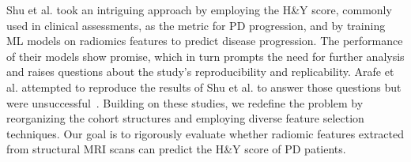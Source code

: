 Shu et al. took an intriguing approach by employing the H\&Y score, commonly used in clinical assessments, as the metric for PD progression, and by training ML models on radiomics features to 
predict disease progression. The performance of their models show promise, which in turn prompts the need for further analysis and raises questions about the study's reproducibility and replicability. 
Arafe et al. attempted to reproduce the results of Shu et al. to answer those questions but were unsuccessful~\cite{Arafe2023.05.05.539590}. Building on these studies, we redefine the problem 
by reorganizing the cohort structures and employing diverse feature selection techniques. Our goal is to rigorously evaluate whether radiomic features extracted from structural MRI scans can 
predict the H\&Y score of PD patients.








 











 
